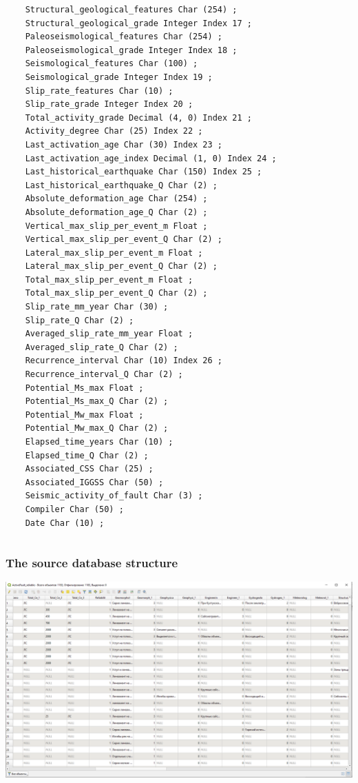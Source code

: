 \documentclass[10pt]{beamer}
\begin{document}
\begin{frame}[fragile]
\begin{columns}
\begin{column}{0.5\linewidth}
\begin{verbatim}
    Structural_geological_features Char (254) ;
    Structural_geological_grade Integer Index 17 ;
    Paleoseismological_features Char (254) ;
    Paleoseismological_grade Integer Index 18 ;
    Seismological_features Char (100) ;
    Seismological_grade Integer Index 19 ;
    Slip_rate_features Char (10) ;
    Slip_rate_grade Integer Index 20 ;
    Total_activity_grade Decimal (4, 0) Index 21 ;
    Activity_degree Char (25) Index 22 ;
    Last_activation_age Char (30) Index 23 ;
    Last_activation_age_index Decimal (1, 0) Index 24 ;
    Last_historical_earthquake Char (150) Index 25 ;
    Last_historical_earthquake_Q Char (2) ;
    Absolute_deformation_age Char (254) ;
    Absolute_deformation_age_Q Char (2) ;
    Vertical_max_slip_per_event_m Float ;
    Vertical_max_slip_per_event_Q Char (2) ;
    Lateral_max_slip_per_event_m Float ;
    Lateral_max_slip_per_event_Q Char (2) ;
    Total_max_slip_per_event_m Float ;
    Total_max_slip_per_event_Q Char (2) ;
    Slip_rate_mm_year Char (30) ;
    Slip_rate_Q Char (2) ;
    Averaged_slip_rate_mm_year Float ;
    Averaged_slip_rate_Q Char (2) ;
    Recurrence_interval Char (10) Index 26 ;
    Recurrence_interval_Q Char (2) ;
    Potential_Ms_max Float ;
    Potential_Ms_max_Q Char (2) ;
    Potential_Mw_max Float ;
    Potential_Mw_max_Q Char (2) ;
    Elapsed_time_years Char (10) ;
    Elapsed_time_Q Char (2) ;
    Associated_CSS Char (25) ;
    Associated_IGGSS Char (50) ;
    Seismic_activity_of_fault Char (3) ;
    Compiler Char (50) ;
    Date Char (10) ;
\end{verbatim}
    \end{column}
  \end{columns}
\end{frame}

\begin{frame}
  \frametitle{The source database structure}
  \centering
  \includegraphics[width=\linewidth]{faults-leaflet-db-content.png}
\end{frame}
\end{document}
